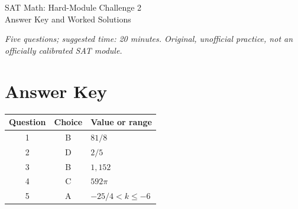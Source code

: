 \documentclass[12pt]{article}
\begin{document}
\begin{center}
  {\Large SAT Math: Hard-Module Challenge 2}\\[0.4em]
  {\large Answer Key and Worked Solutions}
\end{center}

\noindent\textit{Five questions; suggested time: 20 minutes. Original, unofficial practice, not an officially calibrated SAT module.}

\section*{Answer Key}
\begin{center}
\begin{tabular}{ccl}
\textbf{Question} & \textbf{Choice} & \textbf{Value or range} \\\hline
1 & B & $81/8$ \\
2 & D & $2/5$ \\
3 & B & $1{,}152$ \\
4 & C & $592\pi$ \\
5 & A & $-25/4<k\le -6$
\end{tabular}
\end{center}
\end{document}

